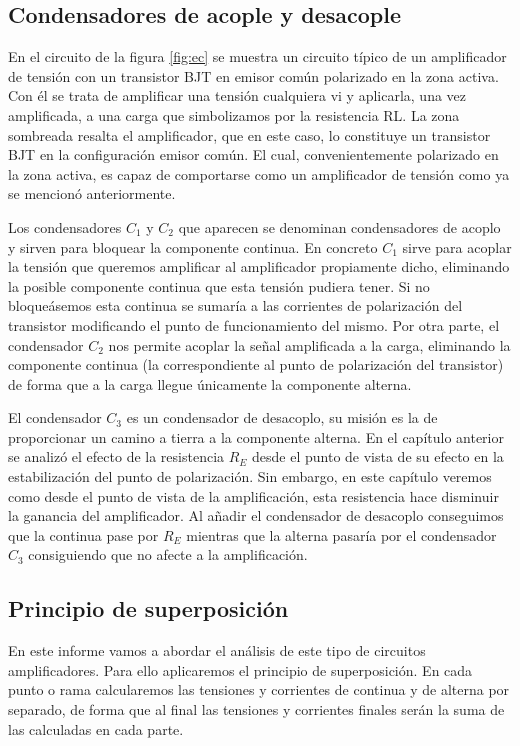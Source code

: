 \subsection{Condensadores de acople y desacople}
En el circuito de la figura \ref{fig:ec} se muestra un circuito típico de un amplificador de tensión con un transistor BJT en emisor común polarizado en la zona activa.
Con él se trata de amplificar una tensión cualquiera vi y aplicarla, una vez amplificada, a una carga que simbolizamos por la resistencia RL. La zona sombreada
resalta el amplificador, que en este caso, lo constituye un transistor BJT en la configuración emisor común. El cual, convenientemente polarizado en la zona activa, es
capaz de comportarse como un amplificador de tensión como ya se mencionó anteriormente.

Los condensadores $C_1$ y $C_2$ que aparecen se denominan condensadores de acoplo y sirven para bloquear la componente continua. En concreto $C_1$ sirve para acoplar la tensión que queremos amplificar al amplificador propiamente dicho, eliminando la posible componente continua que esta tensión pudiera tener. Si no bloqueásemos esta continua se sumaría a las corrientes de polarización del transistor modificando el punto
de funcionamiento del mismo. Por otra parte, el condensador $C_2$ nos permite acoplar la señal amplificada a la carga, eliminando la componente continua (la correspondiente al punto de polarización del transistor) de forma que a la carga llegue únicamente la componente alterna.

El condensador $C_3$ es un condensador de desacoplo, su misión es la de proporcionar un camino a tierra a la componente alterna. En el capítulo anterior se
analizó el efecto de la resistencia $R_E$ desde el punto de vista de su efecto en la estabilización del punto de polarización. Sin embargo, en este capítulo veremos como
desde el punto de vista de la amplificación, esta resistencia hace disminuir la ganancia del amplificador. Al añadir el condensador de desacoplo conseguimos que la continua pase por $R_E$ mientras que la alterna pasaría por el condensador $C_3$ consiguiendo que no
afecte a la amplificación.

\subsection{Principio de superposición}
En este informe vamos a abordar el análisis de este tipo de circuitos amplificadores. Para ello aplicaremos el principio de superposición. En cada punto o rama calcularemos las tensiones y corrientes de continua y de alterna por separado, de forma que al final las tensiones y corrientes finales serán la suma de las calculadas en
cada parte.

